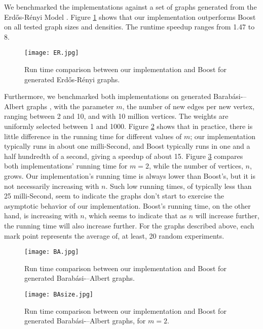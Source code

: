 \documentclass[conference,10pt,twocolumn]{IEEEtran}
\begin{document}
We benchmarked the implementations against a set of graphs generated from the Erd\H{o}s-R\'{e}nyi Model \cite{Erdos}. Figure \ref{fig:ER-time} shows that our implementation outperforms Boost on all tested graph sizes and densities. The runtime speedup ranges from 1.47 to 8.

\begin{figure}[ht!]
\begin{center}
\texttt{[image: ER.jpg]}
\caption{Run time comparison between our implementation and Boost for generated Erd\H{o}s-R\'{e}nyi graphs. }
\label{fig:ER-time}
\end{center}
\end{figure}

Furthermore, we benchmarked both implementations on generated Barab\'{a}si-–Albert graphs \cite{barabasi1999emergence}, with the parameter $m$, the number of new edges per new vertex, ranging between 2 and 10, and with 10 million vertices. The weights are uniformly selected between 1 and 1000. Figure \ref{fig:BA-time} shows that in practice, there is little difference in the running time for different values of $m$; our implementation typically runs in about one milli-Second, and Boost typically runs in one and a half hundredth of a second, giving a speedup of about 15. Figure \ref{fig:BA-size} compares both implementations' running time for $m = 2$, while the number of vertices, $n$, grows. Our implementation's running time is always lower than Boost's, but it is not necessarily increasing with $n$. Such low running times, of typically less than 25 milli-Second, seem to indicate the graphs don't start to exercise the asymptotic behavior of our implementation. Boost's running time, on the other hand, is increasing with $n$, which seems to indicate that as $n$ will increase further, the running time will also increase further. For the graphs described above, each mark point represents the average of, at least, 20 random experiments.

\begin{figure}[ht!]
\begin{center}
\texttt{[image: BA.jpg]}
\caption{Run time comparison between our implementation and Boost for generated Barab\'{a}si-–Albert graphs. }
\label{fig:BA-time}
\end{center}
\end{figure}

\begin{figure}[ht!]
\begin{center}
\texttt{[image: BAsize.jpg]}
\caption{Run time comparison between our implementation and Boost for generated Barab\'{a}si-–Albert graphs, for $m=2$. }
\label{fig:BA-size}
\end{center}
\end{figure}
\end{document}
